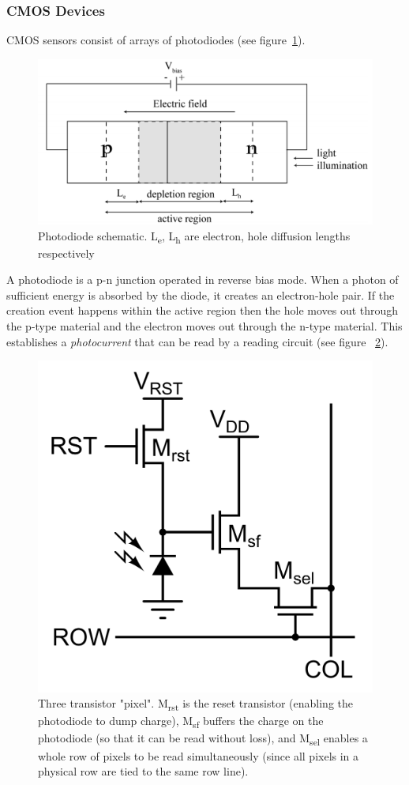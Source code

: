 \subsubsection{CMOS Devices}
CMOS sensors consist of arrays of photodiodes (see figure~\ref{fig:photodiode.png}).
\begin{figure}
    \includegraphics[width=\linewidth,keepaspectratio]{figures/photodiode.png}
    \caption{Photodiode schematic. L\textsubscript{e}, L\textsubscript{h} are electron, hole diffusion lengths respectively\cite{Xu2015FundamentalCO}}
    \label{fig:photodiode.png}
\end{figure}
A photodiode is a p-n junction operated in reverse bias mode.
%
When a photon of sufficient energy is absorbed by the diode, it creates an electron-hole pair.
%
If the creation event happens within the active region then the hole moves out through the p-type material and the electron moves out through the n-type material.
%
This establishes a \textit{photocurrent} that can be read by a reading circuit (see figure ~\ref{fig:3tpixel}).
\begin{figure}
    \center
    \includegraphics[width=.5\linewidth,keepaspectratio]{figures/3t_pixel.png}
    \caption{Three transistor "pixel". M\textsubscript{rst} is the reset transistor (enabling the photodiode to dump charge), M\textsubscript{sf} buffers the charge on the photodiode (so that it can be read without loss), and M\textsubscript{sel} enables a whole row of pixels to be read simultaneously (since all pixels in a physical row are tied to the same row line).}
    \label{fig:3tpixel}
\end{figure}
